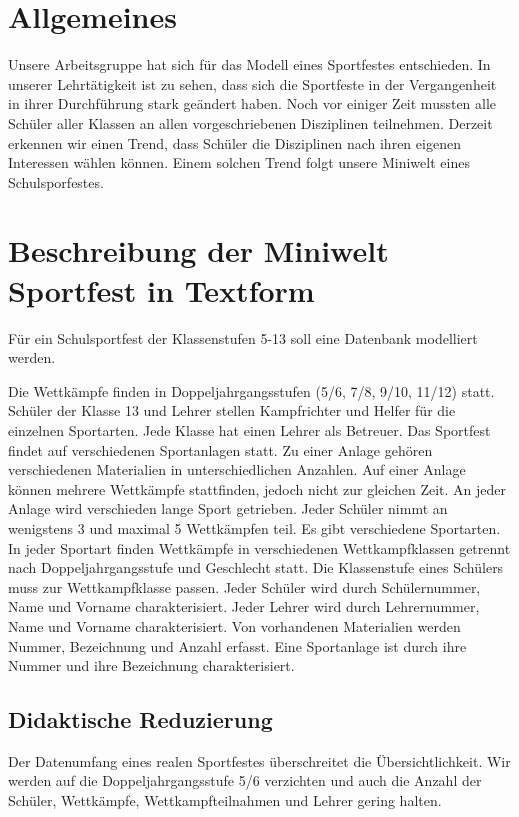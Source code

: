 \documentclass[pagesize,11pt,twoside]{scrartcl}
\begin{document}
\section{Allgemeines}
Unsere Arbeitsgruppe hat sich für das Modell eines Sportfestes entschieden. In unserer Lehrtätigkeit
ist zu sehen, dass sich die Sportfeste in der Vergangenheit in ihrer Durchführung stark geändert haben.
Noch vor einiger Zeit mussten alle Schüler aller Klassen an allen vorgeschriebenen Disziplinen teilnehmen.
Derzeit erkennen wir einen Trend, dass Schüler die Disziplinen
nach ihren eigenen Interessen wählen können. 
Einem solchen Trend folgt unsere Miniwelt eines Schulsporfestes.

\section{Beschreibung der Miniwelt Sportfest in Textform}
Für ein Schulsportfest der Klassenstufen 5-13 soll eine Datenbank modelliert werden.

Die Wettkämpfe finden in Doppeljahrgangsstufen (5/6, 7/8, 9/10, 11/12) statt.
Schüler der Klasse 13 und Lehrer stellen Kampfrichter und Helfer für die einzelnen Sportarten.
Jede Klasse hat einen Lehrer als Betreuer.
Das Sportfest findet auf verschiedenen Sportanlagen statt.
Zu einer Anlage gehören verschiedenen Materialien in unterschiedlichen Anzahlen.
Auf einer Anlage können mehrere Wettkämpfe stattfinden, jedoch nicht zur gleichen Zeit.
An jeder Anlage wird verschieden lange Sport getrieben.
Jeder Schüler nimmt an wenigstens 3 und maximal 5 Wettkämpfen teil.
Es gibt verschiedene Sportarten.
In jeder Sportart finden Wettkämpfe in verschiedenen Wettkampfklassen getrennt nach 
Doppeljahrgangsstufe und Geschlecht statt.
Die Klassenstufe eines Schülers muss zur Wettkampfklasse passen.
Jeder Schüler wird durch Schülernummer, Name und Vorname charakterisiert.
Jeder Lehrer wird durch Lehrernummer, Name und Vorname charakterisiert.
Von vorhandenen Materialien werden Nummer, Bezeichnung und Anzahl erfasst.
Eine Sportanlage ist durch ihre Nummer und ihre Bezeichnung charakterisiert.

\subsection{Didaktische Reduzierung}
Der Datenumfang eines realen Sportfestes überschreitet die Übersichtlichkeit.
Wir werden auf die Doppeljahrgangsstufe 5/6 verzichten und auch die Anzahl der Schüler, 
Wettkämpfe, Wettkampfteilnahmen und Lehrer
gering halten.
\end{document}
